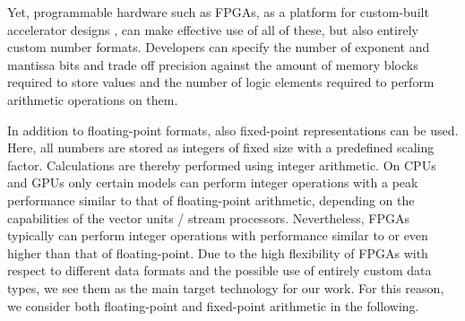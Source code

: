 \documentclass[format=acmsmall,urlbreakonhyphens]{acmart}
\begin{document}

Yet, programmable hardware such as FPGAs, as a platform for custom-built accelerator designs \cite{Strzodka2006, KenterVector, KenterPragma}, can make effective use of all of these, but also entirely custom number formats.
Developers can specify the number of exponent and mantissa bits and trade off precision against the amount of memory blocks required to store values and the number of logic elements required to perform arithmetic operations on them.

In addition to floating-point formats, also fixed-point representations can be used. Here, all numbers are stored as integers of fixed size with a
predefined scaling factor. Calculations are thereby performed using integer arithmetic. On CPUs and GPUs only certain models can perform integer operations with a peak performance similar to that of floating-point arithmetic, depending on the capabilities of the vector units / stream processors. Nevertheless, FPGAs typically can perform integer operations with performance similar to or even higher than that of floating-point. Due to the high flexibility of FPGAs with respect to different data formats and the possible use of entirely custom data types, we see them as the main target technology for our work. For this reason, we consider both floating-point and fixed-point arithmetic in the following.

\end{document}
